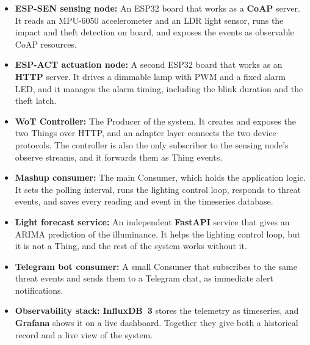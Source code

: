 \documentclass[conference]{IEEEtran}
\begin{document}
\begin{itemize}
\item \textbf{ESP-SEN sensing node:}
An ESP32 board that works as a \textbf{CoAP} server. It reads an MPU-6050 accelerometer and an LDR light sensor, runs the impact and theft detection on board, and exposes the events as observable CoAP resources.

\item \textbf{ESP-ACT actuation node:}
A second ESP32 board that works as an \textbf{HTTP} server. It drives a dimmable lamp with PWM and a fixed alarm LED, and it manages the alarm timing, including the blink duration and the theft latch.

\item \textbf{WoT Controller:}
The Producer of the system. It creates and exposes the two Things over HTTP, and an adapter layer connects the two device protocols. The controller is also the only subscriber to the sensing node's observe streams, and it forwards them as Thing events.

\item \textbf{Mashup consumer:}
The main Consumer, which holds the application logic. It sets the polling interval, runs the lighting control loop, responds to threat events, and saves every reading and event in the timeseries database.

\item \textbf{Light forecast service:}
An independent \textbf{FastAPI} service that gives an ARIMA prediction of the illuminance. It helps the lighting control loop, but it is not a Thing, and the rest of the system works without it.

\item \textbf{Telegram bot consumer:}
A small Consumer that subscribes to the same threat events and sends them to a Telegram chat, as immediate alert notifications.

\item \textbf{Observability stack:}
\textbf{InfluxDB~3} stores the telemetry as timeseries, and \textbf{Grafana} shows it on a live dashboard. Together they give both a historical record and a live view of the system.

\end{itemize}
\end{document}
